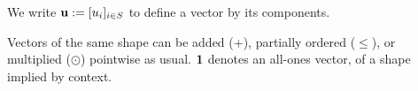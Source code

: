 \documentclass[twoside]{article}
\newcommand\discard[1]{}
\begin{document}
We write $\mathbf{u} := [u_i]_{i \in S}$ to define a vector by its components.
\discard{\color{gray!30!white}
    We will sometimes use superscripts as well, especially when indices depend on one another. For example, if $\dg S$ is a finite set of finite sets, then
    $[u^S_s]^{S \in \dg S}_{s \in S}$ denotes a vector which has an element
    for each pair $(S,s)$, satisfying $s \in S \in \dg S$.
    By supplying just the upper index of such a vector, as in $\mat u^{S_0}$,
    we mean $[u^{S_0}_s]_{s \in {S_0}}$, the projection of $\mat u$ onto the subspace whose upper index is $S_0$.
}
Vectors of the same shape
can be added (+), partially ordered ($\le$), or multiplied ($\odot$) pointwise as usual.
$\mathbf{1}$ denotes an all-ones vector, of a shape implied by context.
\end{document}
